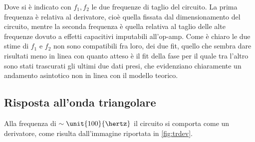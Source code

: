 \documentclass[10pt,a4paper]{article}
\begin{document}
\noindent Dove si è indicato con $f_1, f_2$ le due frequenze di taglio del circuito. La prima frequenza è relativa al derivatore, cioè quella fissata dal dimensionamento del circuito, mentre la seconda frequenza è quella relativa al taglio delle alte frequenze dovuto a effetti capacitivi imputabili all'op-amp. Come è chiaro le due stime di $f_1$ e $f_2$ non sono compatibili fra loro, dei due fit, quello che sembra dare risultati meno in linea con quanto atteso è il fit della fase per il quale tra l'altro sono stati trascurati gli ultimi due dati presi, che evidenziano chiaramente un andamento asintotico non in linea con il modello teorico.
\subsection{Risposta all'onda triangolare}
Alla frequenza di $\sim \unit{100}{\hertz}$ il circuito si comporta come un derivatore, come risulta dall'immagine riportata in \figurename{\ref{fig:trdev}}.
\end{document}
